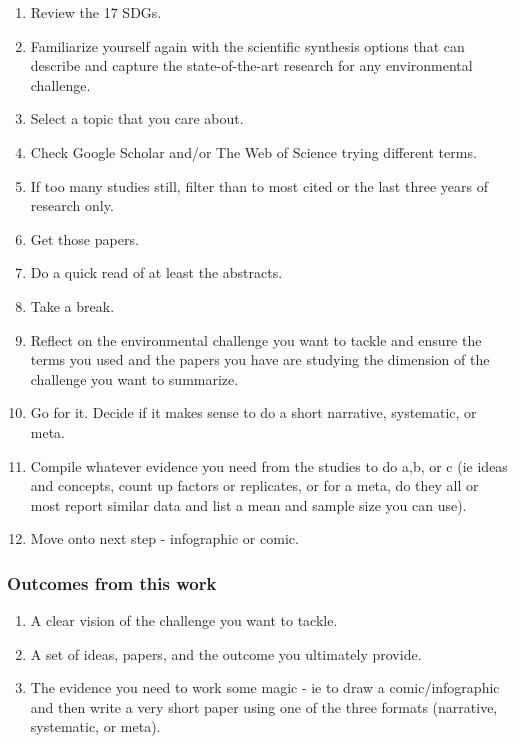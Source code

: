\documentclass[
]{book}
\providecommand{\tightlist}{%
  \setlength{\itemsep}{0pt}\setlength{\parskip}{0pt}}
\begin{document}
\begin{enumerate}
\def\labelenumi{\arabic{enumi}.}
\tightlist
\item
  Review the 17 SDGs.
\item
  Familiarize yourself again with the scientific synthesis options that can describe and capture the state-of-the-art research for any environmental challenge.\\
\item
  Select a topic that you care about.\\
\item
  Check Google Scholar and/or The Web of Science trying different terms.\\
\item
  If too many studies still, filter than to most cited or the last three years of research only.\\
\item
  Get those papers.\\
\item
  Do a quick read of at least the abstracts.\\
\item
  Take a break.\\
\item
  Reflect on the environmental challenge you want to tackle and ensure the terms you used and the papers you have are studying the dimension of the challenge you want to summarize.\\
\item
  Go for it. Decide if it makes sense to do a short narrative, systematic, or meta.\\
\item
  Compile whatever evidence you need from the studies to do a,b, or c (ie ideas and concepts, count up factors or replicates, or for a meta, do they all or most report similar data and list a mean and sample size you can use).\\
\item
  Move onto next step - infographic or comic.
\end{enumerate}

\hypertarget{outcomes-from-this-work}{%
\subsubsection*{Outcomes from this work}\label{outcomes-from-this-work}}

\begin{enumerate}
\def\labelenumi{\arabic{enumi}.}
\tightlist
\item
  A clear vision of the challenge you want to tackle.\\
\item
  A set of ideas, papers, and the outcome you ultimately provide.\\
\item
  The evidence you need to work some magic - ie to draw a comic/infographic and then write a very short paper using one of the three formats (narrative, systematic, or meta).
\end{enumerate}
\end{document}
